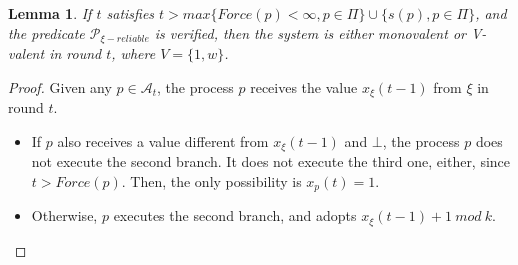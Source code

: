 \documentclass{article}
\newtheorem{lemma}{Lemma}[section]
\begin{document}
\begin{lemma}\label{lem:mono_bi}
	If $t$ satisfies $t > max \{Force(p) < \infty, p \in \Pi\} \cup \{s(p), p \in \Pi\}$, and the predicate $\mathcal{P}_{\xi-reliable}$ is verified,
	then the system is either monovalent or V-valent in round $t$, where $V = \{1, w\}$.
\end{lemma}
\begin{proof}
	Given any $p \in \mathcal{A}_t$, the process $p$ receives the value $x_\xi(t-1)$ from $\xi$ in round $t$.
	\begin{itemize}
		\item If $p$ also receives a value different from $x_\xi(t-1)$ and $\bot$, the process $p$ does not 
			execute the second branch. It does not execute the third one, either, since $t > Force(p)$.
			Then, the only possibility is $x_p(t) = 1$.
		\item Otherwise, $p$ executes the second branch, and adopts $x_\xi(t-1)+1~mod~k$.
	\end{itemize}
\end{proof}
\end{document}
